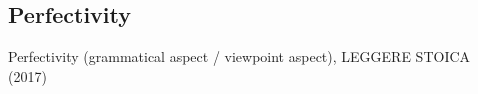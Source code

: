 


\subsection{Perfectivity} 

Perfectivity (grammatical aspect / viewpoint aspect), LEGGERE STOICA (2017)

